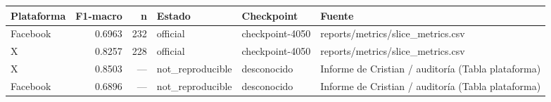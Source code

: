 \begin{tabular}{lrrlll}
\toprule
Plataforma & F1-macro & n & Estado & Checkpoint & Fuente \\
\midrule
Facebook & 0.6963 & 232 & official & checkpoint-4050 & reports/metrics/slice\_metrics.csv \\
X & 0.8257 & 228 & official & checkpoint-4050 & reports/metrics/slice\_metrics.csv \\
X & 0.8503 & --- & not\_reproducible & desconocido & Informe de Cristian / auditoría (Tabla plataforma) \\
Facebook & 0.6896 & --- & not\_reproducible & desconocido & Informe de Cristian / auditoría (Tabla plataforma) \\
\bottomrule
\end{tabular}
